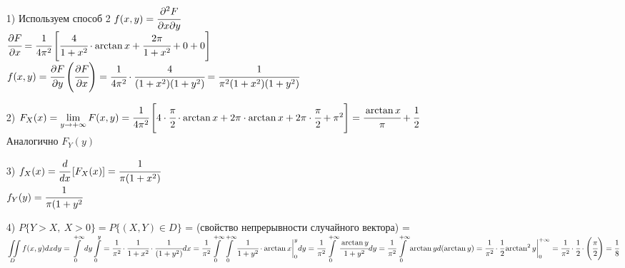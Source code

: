 \begin{enumerate}
	\item[1)] Используем способ 2
	$f(x,y) = \cfrac{\partial^2 F}{\partial x \partial y}$\\
	$\cfrac{\partial F}{\partial x} = \cfrac{1}{4 \pi^2} \left[ \cfrac{4}{1 + x^2} \cdot \arctan{x} + \cfrac{2 \pi}{1 + x^2} + 0 + 0 \right]$\\
	$f(x,y) = \cfrac{\partial F}{\partial y} \left( \cfrac{\partial F}{\partial x} \right) = \cfrac{1}{4 \pi^2} \cdot \cfrac{4}{(1 + x^2)(1 + y^2)} = \cfrac{1}{\pi^2 (1 + x^2)(1 + y^2)}$\\
	
	\item[2)] $F_X(x) = \lim\limits_{y \to +\infty} F(x,y) = \cfrac{1}{4 \pi^2} \left[ 4 \cdot \cfrac{\pi}{2} \cdot \arctan{x} + 2\pi \cdot \arctan{x} + 2\pi \cdot \cfrac{\pi}{2} + \pi^2 \right] = \cfrac{\arctan{x}}{\pi} + \cfrac{1}{2}$\\
	Аналогично $F_Y(y)$
	
	\item[3)] $f_X(x) = \cfrac{d}{dx} \left[F_X(x)\right] = \cfrac{1}{\pi (1 + x^2)}$\\
	$f_Y(y) = \cfrac{1}{\pi (1 + y^2}$\\
	
	\item[4)] %
	$P\{Y > X, \ X > 0\} = P\{(X,Y) \in D\}$ = (свойство непрерывности случайного вектора) = $\displaystyle  \iint\limits_{D} f(x,y) dxdy = \int\limits_0^{+\infty} dy \int\limits_0^y = \cfrac{1}{\pi^2} \cdot \cfrac{1}{1 + x^2} \cdot \cfrac{1}{(1 + y^2)} dx = \cfrac{1}{\pi^2} \int \limits_0^{+\infty} \int\limits_0^{+\infty} \cfrac{1}{1 + y^2} \cdot \arctan{x} \bigg|_0^y dy = \cfrac{1}{\pi^2} \int\limits_0^{+\infty} \cfrac{\arctan{y}}{1 + y^2} dy = \cfrac{1}{\pi^2} \int\limits_0^{+\infty} \arctan{y} d(\arctan{y}) = \cfrac{1}{\pi^2} \cdot \cfrac{1}{2} \arctan^2{y} \bigg|_0^{+\infty} = \cfrac{1}{\pi^2} \cdot \cfrac{1}{2} \cdot \left(\cfrac{\pi}{2}\right) = \cfrac{1}{8}$\\
\end{enumerate}


